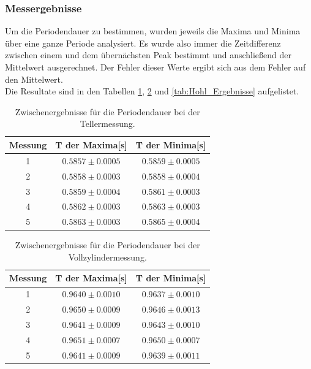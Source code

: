 \documentclass[12pt,a4paper]{article}
\begin{document}
\subsubsection{Messergebnisse}
Um die Periodendauer zu bestimmen, wurden jeweils die Maxima und Minima über eine ganze Periode analysiert. Es wurde also immer die Zeitdifferenz zwischen einem und dem übernächsten Peak bestimmt und anschließend der Mittelwert ausgerechnet. Der Fehler dieser Werte ergibt sich aus dem Fehler auf den Mittelwert.\\
Die Resultate sind in den Tabellen \ref{tab:Teller_Ergebnisse}, \ref{tab:Voll_Ergebnisse} und \ref{tab:Hohl_Ergebnisse} aufgelistet.
\begin{table}[H]
\caption{Zwischenergebnisse für die Periodendauer bei der Tellermessung.}
\begin{center}
\begin{tabular}{|c|c|c|}
\hline
Messung & T der Maxima[s] & T der Minima[s]  \\
\hline
1  & $ 0.5857 \pm  0.0005 $ & $ 0.5859 \pm  0.0005 $ \\
\hline
2  & $ 0.5858 \pm  0.0003 $ & $ 0.5858 \pm  0.0004 $ \\
\hline
3  & $ 0.5859 \pm  0.0004 $ & $ 0.5861 \pm  0.0003 $ \\
\hline
4  & $ 0.5862 \pm  0.0003 $ & $ 0.5863 \pm  0.0003 $ \\
\hline
5  & $ 0.5863 \pm  0.0003 $ & $ 0.5865 \pm  0.0004 $ \\
\hline
\end{tabular}
\end{center}
\label{tab:Teller_Ergebnisse}
\end{table}

\begin{table}[H]
\caption{Zwischenergebnisse für die Periodendauer bei der Vollzylindermessung.}
\begin{center}
\begin{tabular}{|c|c|c|}
\hline
Messung &  T der Maxima[s] &  T der Minima[s]  \\
\hline
1  & $ 0.9640 \pm  0.0010 $ & $ 0.9637 \pm  0.0010 $ \\
\hline
2  & $ 0.9650 \pm  0.0009 $ & $ 0.9646 \pm  0.0013 $ \\
\hline
3  & $ 0.9641 \pm  0.0009 $ & $ 0.9643 \pm  0.0010 $ \\
\hline
4  & $ 0.9651 \pm  0.0007 $ & $ 0.9650 \pm  0.0007 $ \\
\hline
5  & $ 0.9641 \pm  0.0009 $ & $ 0.9639 \pm  0.0011 $ \\
\hline
\end{tabular}
\end{center}
\label{tab:Voll_Ergebnisse}
\end{table}
\end{document}
